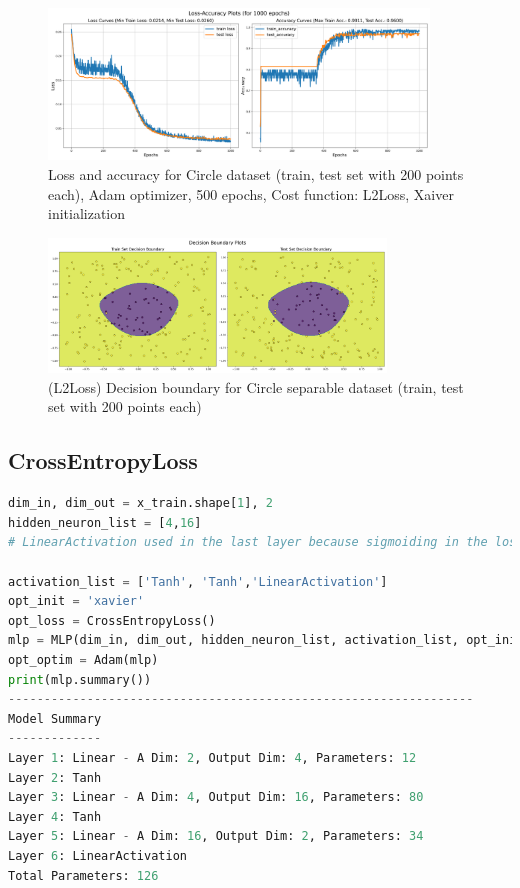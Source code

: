 \begin{solve}
\begin{figure}[H]
    \centering
    \includegraphics[width=0.9\textwidth]{plots/4_circle_adam_regressionloss_acc.png}
    \caption{Loss and accuracy for Circle dataset (train, test set with 200 points each), Adam optimizer, 500 epochs, Cost function: L2Loss, Xaiver initialization}
\end{figure}

\begin{figure}[H]
    \centering
    \includegraphics[width=0.8\textwidth]{plots/4_circle_adam_regressionboundary.png}
    \caption{(L2Loss) Decision boundary for Circle separable dataset (train, test set with 200 points each)}
\end{figure}


\subsection{CrossEntropyLoss}

\begin{lstlisting}[language=python]
    dim_in, dim_out = x_train.shape[1], 2
hidden_neuron_list = [4,16]
# LinearActivation used in the last layer because sigmoiding in the loss function forward pass

activation_list = ['Tanh', 'Tanh','LinearActivation']
opt_init = 'xavier'
opt_loss = CrossEntropyLoss()
mlp = MLP(dim_in, dim_out, hidden_neuron_list, activation_list, opt_init)
opt_optim = Adam(mlp)
print(mlp.summary())
-----------------------------------------------------------------
Model Summary
-------------
Layer 1: Linear - A Dim: 2, Output Dim: 4, Parameters: 12
Layer 2: Tanh
Layer 3: Linear - A Dim: 4, Output Dim: 16, Parameters: 80
Layer 4: Tanh
Layer 5: Linear - A Dim: 16, Output Dim: 2, Parameters: 34
Layer 6: LinearActivation
Total Parameters: 126
\end{lstlisting}


\end{solve}

